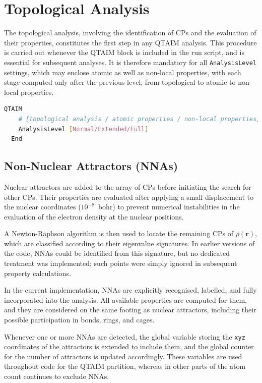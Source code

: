 \newpage
\section{Topological Analysis}

The topological analysis, involving the identification of \glspl{CP} and the
evaluation of their properties, constitutes the first step in any \gls{QTAIM}
analysis. This procedure is carried out whenever the \gls{QTAIM} block is
included in the run script, and is essential for subsequent analyses.  It is
therefore mandatory for all \texttt{AnalysisLevel} settings, which may enclose
atomic as well as non-local properties, with each stage computed only after the
previous level, from topological to atomic to non-local properties.

\begin{lstlisting}[language=bash]
  QTAIM
    # [topological analysis / atomic properties / non-local properties]
    AnalysisLevel [Normal/Extended/Full]
  End
\end{lstlisting}

\subsection{Non-Nuclear Attractors (\glspl{NNA})}

Nuclear attractors are added to the array of \glspl{CP} before initiating the
search for other \glspl{CP}. Their properties are evaluated after applying a
small displacement to the nuclear coordinates ($10^{-8}$~bohr) to prevent
numerical instabilities in the evaluation of the electron density at the
nuclear positions.

A Newton-Raphson algorithm is then used to locate the remaining \glspl{CP} of
$\rho(\mathbf{r})$, which are classified according to their eigenvalue
signatures. In earlier versions of the code, \glspl{NNA} could be identified
from this signature, but no dedicated treatment was implemented; such points
were simply ignored in subsequent property calculations.

In the current implementation, \glspl{NNA} are explicitly recognised, labelled,
and fully incorporated into the analysis. All available properties are computed
for them, and they are considered on the same footing as nuclear attractors,
including their possible participation in bonds, rings, and cages.

Whenever one or more \glspl{NNA} are detected, the global variable storing the
\texttt{xyz} coordinates of the attractors is extended to include them, and the
global counter for the number of attractors is updated accordingly. These
variables are used throughout \ams code for the \gls{QTAIM} partition,
whereas in other parts of \ams the atom count continues to exclude
\glspl{NNA}.

